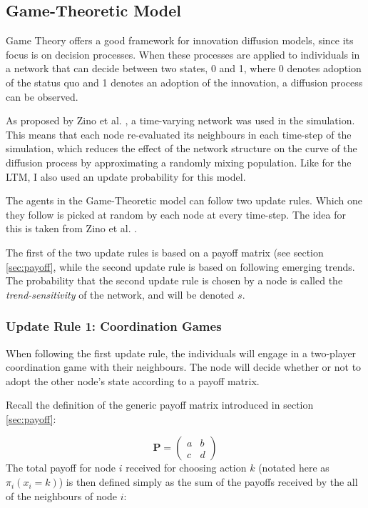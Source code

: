 \documentclass[11pt]{article}
\begin{document}
	\subsection{Game-Theoretic Model} \label{sec:GTM}
	Game Theory offers a good framework for innovation diffusion models, since its focus is on decision processes. When these processes are applied to individuals in a network that can decide between two states, 0 and 1, where 0 denotes adoption of the status quo and 1 denotes an adoption of the innovation, a diffusion process can be observed.
	
	As proposed by Zino et al. \autocite{Zino23}, a time-varying network was used in the simulation. This means that each node re-evaluated its neighbours in each time-step of the simulation, which reduces the effect of the network structure on the curve of the diffusion process by approximating a randomly mixing population. Like for the LTM, I also used an update probability for this model.
	
	The agents in the Game-Theoretic model can follow two update rules. Which one they follow is picked at random by each node at every time-step. The idea for this is taken from Zino et al. \autocite{Zino23}.
	
	The first of the two update rules is based on a payoff matrix (see section \ref{sec:payoff}, while the second update rule is based on following emerging trends. The probability that the second update rule is chosen by a node is called the \textit{trend-sensitivity} of the network, and will be denoted $s$. 
	
	
	
	\subsubsection{Update Rule 1: Coordination Games}
	When following the first update rule, the individuals will engage in a two-player coordination game with their neighbours. The node will decide whether or not to adopt the other node's state according to a payoff matrix.
	
	Recall the definition of the generic payoff matrix introduced in section \ref{sec:payoff}:
	
	$$\mathbf{P}=\begin{pmatrix} 
		a & b \\
		c & d
	\end{pmatrix}$$
	The total payoff for node $i$ received for choosing action $k$ (notated here as $\pi_i(x_i = k)$) is then defined simply as the sum of the payoffs received by the all of the neighbours of node $i$:
	
\end{document}
